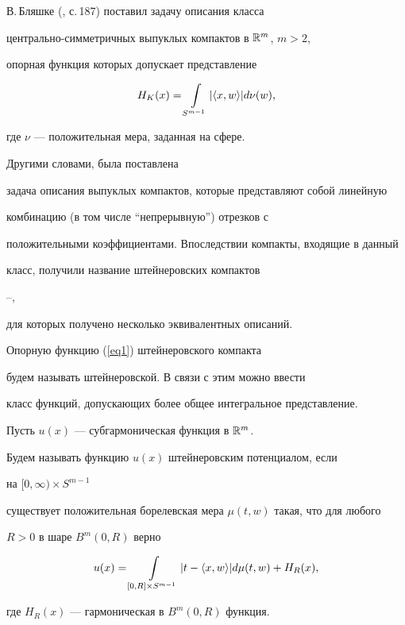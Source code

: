 В.\,Бляшке (\cite{Blaschke}, с.\,187) поставил задачу описания класса 


центрально-симметричных выпуклых компактов в $\Bbb R^m$, $m>2$,


опорная функция которых допускает представление


\begin{equation}\label{eq1}


H_{K}(x)=\int\limits_{S^{m-1}} |\la x,w\ra |d\nu(w),


\end{equation}


где $\nu$ --- положительная мера, заданная на сфере. 


Другими словами, была поставлена


задача описания выпуклых компактов, которые представляют собой линейную


комбинацию (в том числе ``непрерывную'') отрезков с


положительными коэффициентами. Впоследствии компакты, входящие в данный


класс, получили название штейнеровских компактов 


\cite{Bolker}--\cite{Choquet},


для которых получено несколько эквивалентных описаний. 





Опорную функцию (\ref{eq1}) штейнеровского компакта 


будем называть штейнеровской. В связи с этим можно ввести


класс функций, допускающих более общее интегральное представление. 





\begin{defnnonum}


Пусть $u(x)$ --- субгармоническая функция в $\Bbb R^m$. 


Будем называть функцию $u(x)$ штейнеровским потенциалом, если 


на $[0,\infty)\times S^{m-1}$ 


существует положительная борелевская мера $\mu(t,w)$ такая, что для любого


$R>0$ в шаре $B^m(0,R)$ верно 


\begin{equation}\label{eq2}


u(x)=\int\limits_{[0,R]\times S^{m-1}}|t-\la x,w\ra |d\mu(t,w)+H_R(x),


\end{equation}


где $H_R(x)$ --- гармоническая в $B^m(0,R)$ функция.


\end{defnnonum}






